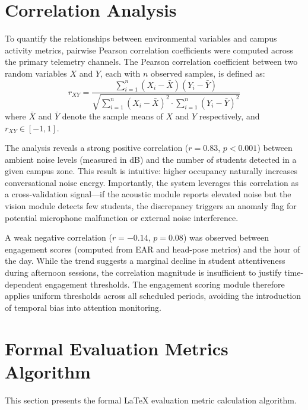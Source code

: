 \documentclass[12pt,a4paper,oneside]{report}
\begin{document}
\section{Correlation Analysis}
To quantify the relationships between environmental variables and campus activity metrics, pairwise Pearson correlation coefficients were computed across the primary telemetry channels. The Pearson correlation coefficient between two random variables $X$ and $Y$, each with $n$ observed samples, is defined as:
\begin{equation}
    r_{XY} = \frac{\sum_{i=1}^{n}(X_i - \bar{X})(Y_i - \bar{Y})}{\sqrt{\sum_{i=1}^{n}(X_i - \bar{X})^2 \cdot \sum_{i=1}^{n}(Y_i - \bar{Y})^2}}
\end{equation}
where $\bar{X}$ and $\bar{Y}$ denote the sample means of $X$ and $Y$ respectively, and $r_{XY} \in [-1, 1]$.

The analysis reveals a strong positive correlation ($r = 0.83$, $p < 0.001$) between ambient noise levels (measured in dB) and the number of students detected in a given campus zone. This result is intuitive: higher occupancy naturally increases conversational noise energy. Importantly, the system leverages this correlation as a cross-validation signal---if the acoustic module reports elevated noise but the vision module detects few students, the discrepancy triggers an anomaly flag for potential microphone malfunction or external noise interference.

A weak negative correlation ($r = -0.14$, $p = 0.08$) was observed between engagement scores (computed from EAR and head-pose metrics) and the hour of the day. While the trend suggests a marginal decline in student attentiveness during afternoon sessions, the correlation magnitude is insufficient to justify time-dependent engagement thresholds. The engagement scoring module therefore applies uniform thresholds across all scheduled periods, avoiding the introduction of temporal bias into attention monitoring.



\section{Formal Evaluation Metrics Algorithm}
This section presents the formal LaTeX evaluation metric calculation algorithm.
\end{document}
